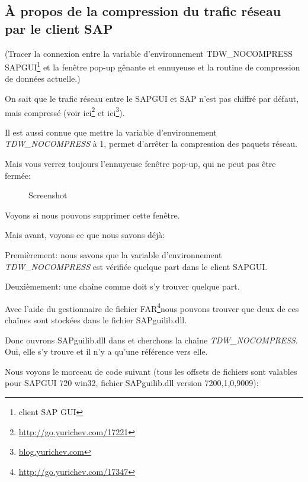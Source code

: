 \subsection{À propos de la compression du trafic réseau par le client SAP}
\label{sec:SAPGUI}


\newcommand{\TDWNC}{TDW\_NOCOMPRESS\xspace}

(Tracer la connexion entre la variable d'environnement \TDWNC{} SAPGUI\footnote{client SAP GUI}
et la fenêtre pop-up gênante et ennuyeuse et la routine de compression de données actuelle.)
 
On sait que le trafic réseau entre le SAPGUI et SAP n'est pas chiffré par défaut,
mais compressé (voir ici\footnote{\url{http://go.yurichev.com/17221}} et
ici\footnote{\href{http://go.yurichev.com/17225}{blog.yurichev.com}}).

Il est aussi connue que mettre la variable d'environnement \emph{\TDWNC} à 1,
permet d'arrêter la compression des paquets réseau.

Mais vous verrez toujours l'ennuyeuse fenêtre pop-up, qui ne peut pas être fermée:

\begin{figure}[H]
\centering
{}
\caption{Screenshot}
\end{figure}

Voyons si nous pouvons supprimer cette fenêtre.

Mais avant, voyons ce que nous savons déjà:

Premièrement: nous savons que la variable d'environnement \emph{\TDWNC} est vérifiée
quelque part dans le client SAPGUI.

Deuxièmement: une chaîne comme  doit s'y trouver
quelque part.
\newcommand{\FNURLFAR}{\footnote{\url{http://go.yurichev.com/17347}}}

Avec l'aide du gestionnaire de fichier FAR\FNURLFAR nous pouvons trouver que deux
de ces chaînes sont stockées dans le fichier SAPguilib.dll.

Donc ouvrons SAPguilib.dll dans \IDA et cherchons la chaîne \emph{\TDWNC}.
Oui, elle s'y trouve et il n'y a qu'une référence vers elle.

Nous voyons le morceau de code suivant (tous les offsets de fichiers sont valables
pour SAPGUI 720 win32, fichier SAPguilib.dll version 7200,1,0,9009):

